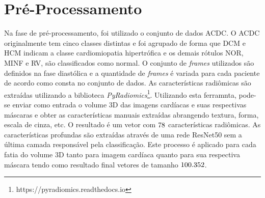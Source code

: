 

\section{Pré-Processamento}
\label{subsec:cap4_preprocess}

Na fase de pré-processamento, foi utilizado o conjunto de dados \gls{ACDC}. O \gls{ACDC} originalmente tem cinco classes distintas e foi agrupado de forma que DCM e HCM indicam a classe cardiomiopatia hipertrófica e os demais rótulos NOR, MINF e RV, são classificados como normal. O conjunto de \textit{frames} utilizados são definidos na fase diastólica e a quantidade de \textit{frames} é variada para cada paciente de acordo como consta no conjunto de dados. As características radiômicas são extraídas utilizando a biblioteca \textit{PyRadiomics}\footnote{https://pyradiomics.readthedocs.io}. Utilizando esta ferramnta, pode-se enviar como entrada o volume 3D das imagens cardíacas e suas respectivas máscaras e obter as características manuais extraídas abrangendo textura, forma, escala de cinza, etc. O resultado é um vetor com $78$ características radiômicas. As características profundas são extraídas através de uma rede ResNet50 sem a última camada responsável pela classificação. Este processo é aplicado para cada fatia do volume 3D tanto para imagem cardíaca quanto para sua respectiva máscara tendo como resultado final vetores de tamanho $100.352$. 

